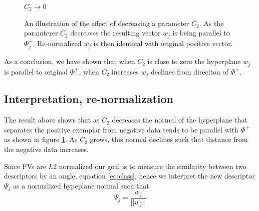 \documentclass[table]{article} %
\begin{document}
			\begin{figure}[t]
			    \begin{center}
                    $C_2 \rightarrow 0$
			    \caption{An illustration of the effect of decreasing a parameter $C_2$. As the paramterer $C_2$ decreases the resulting vector $w_j$ is being parallel to $\Phi_j^+$. Re-normalized $w_j$ is then identical with original positive vector.}
			    \label{fig:C2effect}
                \end{center}
			\end{figure}

		As a conclusion, we have shown that when $C_2$ is close to zero the hyperplane $w_j$ is parallel to original $\Phi^+$, when $C_2$ increases $w_j$ declines from direciton of $\Phi^+$. 

	\subsection*{Interpretation, re-normalization} \vspace{-0.2cm}
	  	The result above shows that as $C_2$ decreases the normal of the hyperplane that separates the positive exemplar from negative data tends to be parallel with $\Phi^+$ as shown in figure \ref{fig:C2effect}. As $C_2$ grows, this normal declines such that distance from the negative data increases.

		Since FVs are $L2$ normalized our goal is to measure the similarity between two descriptors by an angle, equation \eqref{eq:class}, hence we interpret the new descriptor $\Psi_j$ as a normalized hypeplane normal such that
		  	\begin{equation}
		  		\Psi_j=\dfrac{w_j}{||w_j||}
		  	\end{equation}
\end{document}
